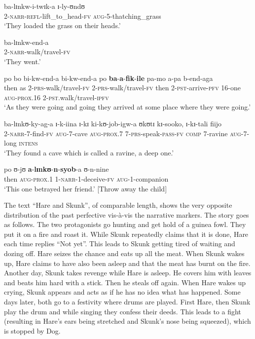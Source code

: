 \begin{exe}
	\ex \label{exThrowAwayTheChildPstPfv}
	\begin{xlist}
		\ex \gll ba-lɪnkw-i-twɪk-a ɪ-ly-ʊndʊ\\
		2-\textsc{narr}-\textsc{refl}-lift\_to\_head-\textsc{fv} \textsc{aug}-5-thatching\_grass\\
		\glt \lq They loaded the grass on their heads.'
		
		\ex \gll ba-lɪnkw-end-a\\
		2-\textsc{narr}-walk/travel-\textsc{fv}\\
		\glt \lq They went.'
		
		\ex \label{exThrowAwayTheChildPstPfvSentence3}
		\gll po bo bi-kw-end-a bi-kw-end-a po \textbf{ba}-\textbf{a}-\textbf{fik}-\textbf{ile} pa-mo a-pa b-end-aga\\
		then as 2-\textsc{prs}-walk/travel-\textsc{fv} 2-\textsc{prs}-walk/travel-\textsc{fv} then 2-\textsc{pst}-arrive-\textsc{pfv} 16-one \textsc{aug}-\textsc{prox.16} 2-\textsc{pst}.walk/travel-\textsc{ipfv}\\
		\glt \lq As they were going and going they arrived at some place where they were going.'
		
		\ex\gll ba-lɪnkʊ-ky-ag-a ɪ-k-iina ɪ-kɪ ki-kʊ-job-igw-a ʊkʊtɪ kɪ-sooko, ɪ-kɪ-tali fiijo\\
		2-\textsc{narr}-7-find-\textsc{fv} \textsc{aug}-7-cave \textsc{aug}-\textsc{prox.7} 7-\textsc{prs}-speak-\textsc{pass}-\textsc{fv} \textsc{comp} 7-ravine \textsc{aug}-7-long \textsc{intens}\\
		\glt \lq They found a cave which is called a ravine, a deep one.'
		
		\ex \gll po ʊ-jʊ \textbf{a}-\textbf{lɪnkʊ}-\textbf{n}-\textbf{syob}-a ʊ-n-nine\\
		then \textsc{aug}-\textsc{prox.1} 1-\textsc{narr}-1-deceive-\textsc{fv} \textsc{aug}-1-companion\\
		\glt \lq This one betrayed her friend.' [Throw away the child]
	\end{xlist}
\end{exe}

The text ``Hare and Skunk'', of comparable length, shows the very opposite distribution of the past perfective vis-à-vis the narrative markers. The story goes as follows. The two protagonists go hunting and get hold of a guinea fowl. They put it on a fire and roast it. While Skunk repeatedly claims that it is done, Hare each time replies ``Not yet''. This leads to Skunk getting tired of waiting and dozing off. Hare seizes the chance and eats up all the meat. When Skunk wakes up, Hare claims to have also been asleep and that the meat has burnt on the fire. Another day, Skunk takes revenge while Hare is asleep. He covers him with leaves and beats him hard with a stick. Then he steals off again. When Hare wakes up crying, Skunk appears and acts as if he has no idea what has happened. Some days later, both go to a festivity where drums are played. First Hare, then Skunk play the drum and while singing they confess their deeds. This leads to a fight (resulting in Hare's ears being stretched and Skunk's nose being squeezed), which is stopped by Dog.

